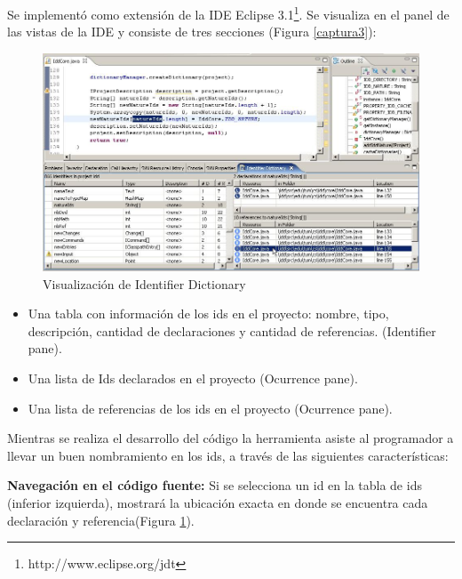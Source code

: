 \documentclass[a4paper,12pt]{report}
\begin{document}
Se implementó como extensión de la IDE Eclipse 3.1\footnote[2]{http://www.eclipse.org/jdt}. Se visualiza en el panel de las vistas de la IDE y consiste de tres secciones (Figura \ref{captura3}):

\begin{figure}[t] %
\centerline{%
\includegraphics[scale= 0.50]{./idd_3.png}
}
\caption{Visualización de Identifier Dictionary}
\label{captura4}
\end{figure} 

\begin{itemize}
\itemsep0em%
\item Una tabla con información de los ids en el proyecto: nombre, tipo, descripción, cantidad de declaraciones y cantidad de referencias. (Identifier pane).
\item Una lista de Ids declarados en el proyecto (Ocurrence pane).
\item Una lista de referencias de los ids en el proyecto (Ocurrence pane).
\end{itemize}

Mientras se realiza el desarrollo del código la herramienta asiste al programador a llevar un buen nombramiento en los ids, a través de las siguientes características:

\textbf{Navegación en el código fuente:} Si se selecciona un id en la tabla de ids (inferior izquierda), mostrará la ubicación exacta en donde se encuentra cada declaración y referencia(Figura \ref{captura4}).


%
\end{document}
